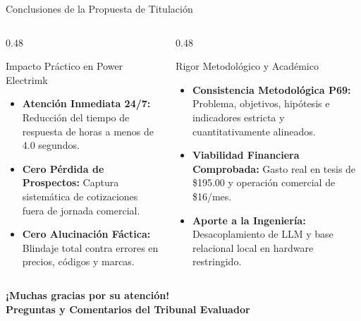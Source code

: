 \documentclass[aspectratio=169, 10pt]{beamer}
\begin{document}
\begin{frame}{Conclusiones de la Propuesta de Titulación}
  \begin{columns}[t]
    \begin{column}{0.48\textwidth}
      \begin{exampleblock}{Impacto Práctico en Power Electrimk}
        \begin{itemize}\footnotesize\setlength{\itemsep}{2pt}
          \item \textbf{Atención Inmediata 24/7:} Reducción del tiempo de respuesta de horas a menos de 4.0 segundos.
          \item \textbf{Cero Pérdida de Prospectos:} Captura sistemática de cotizaciones fuera de jornada comercial.
          \item \textbf{Cero Alucinación Fáctica:} Blindaje total contra errores en precios, códigos y marcas.
        \end{itemize}
      \end{exampleblock}
    \end{column}
    
    \begin{column}{0.48\textwidth}
      \begin{block}{Rigor Metodológico y Académico}
        \begin{itemize}\footnotesize\setlength{\itemsep}{2pt}
          \item \textbf{Consistencia Metodológica P69:} Problema, objetivos, hipótesis e indicadores estricta y cuantitativamente alineados.
          \item \textbf{Viabilidad Financiera Comprobada:} Gasto real en tesis de \$195.00 y operación comercial de \$16/mes.
          \item \textbf{Aporte a la Ingeniería:} Desacoplamiento de LLM y base relacional local en hardware restringido.
        \end{itemize}
      \end{block}
    \end{column}
  \end{columns}
  
  \vspace{0.35cm}
  \begin{center}
    {\large \textbf{¡Muchas gracias por su atención!}} \\[0.15cm]
    \textbf{Preguntas y Comentarios del Tribunal Evaluador}
  \end{center}
\end{frame}
\end{document}
